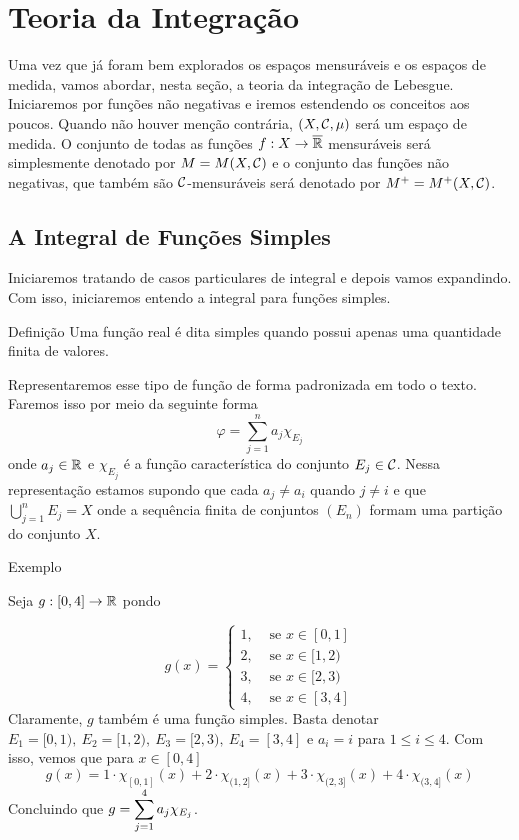 \chapter{Teoria da Integração}
Uma vez que já foram bem explorados os espaços mensuráveis e os espaços de medida, vamos abordar, nesta seção, a teoria da integração de Lebesgue.
Iniciaremos por funções não negativas e iremos estendendo os conceitos aos poucos.
Quando não houver menção contrária, $(X, \operatorname{\mathcal{C}}, \mu)$ será um espaço de medida.
O conjunto de todas as funções $f:X \to \operatorname{\overline{\mathbb{R}}}$ mensuráveis será simplesmente denotado por $M = M(X, \operatorname{\mathcal{C}})$ e o conjunto das funções não negativas, que também são $\operatorname{\mathcal{C}}$-mensuráveis será denotado por $M^+ = M^+(X, \operatorname{\mathcal{C}})$. 

\section{A Integral de Funções Simples}
	Iniciaremos tratando de casos particulares de integral e depois vamos expandindo.
	Com isso, iniciaremos entendo a integral para funções simples.

\begin{env}{Definição}
    Uma função real é dita simples quando possui apenas uma quantidade finita de valores.
\end{env}

Representaremos esse tipo de função de forma padronizada em todo o texto.
Faremos isso por meio da seguinte forma
$$
\varphi =  \sum_{j = 1}^n a_j\chi_{E_j}
$$
onde $a_j \in \mathbb{R}$ e $\chi_{E_j}$ é a função característica do conjunto $E_j \in \operatorname{\mathcal{C}}$.
Nessa representação estamos supondo que cada $a_j \neq a_i$ quando $j \neq i$ e que
$\displaystyle \bigcup_{j = 1}^n E_j = X$ onde a sequência finita de conjuntos $(E_n)$ formam uma partição do conjunto $X$.

\begin{env}{Exemplo}
\label{ex:função-escada-part-2}

    Seja $g: [0,4] \to \mathbb{R}$ pondo 
    
    $$g(x) = \left\{
    \begin{array}{cc}
         1, & \textrm{\ se } x \in [0,1] \\
         2, & \textrm{\ se } x \in [1,2) \\
         3, & \textrm{\ se } x \in [2,3) \\
         4, & \textrm{\ se } x \in [3,4]
    \end{array}\right.
    $$
    Claramente, $g$ também é uma função simples.
    Basta denotar 
    $E_1 = [0,1),\ 
     E_2 = [1,2),\   
     E_3 = [2,3),\  
     E_4 = [3,4]$ e 
     $ a_i = i$ para $1 \leq i \leq 4$.
    Com isso, vemos que para $x \in [0,4]$
    $$
    g(x) = 1\cdot \chi_{[0,1]}(x) + 2\cdot \chi_{(1,2]}(x) + 3\cdot \chi_{(2,3]}(x) + 4\cdot \chi_{(3,4]}(x)
    $$
    Concluindo que $g = \displaystyle \sum_{j = 1}^4 a_j\chi_{E_j}$. 
\end{env}

